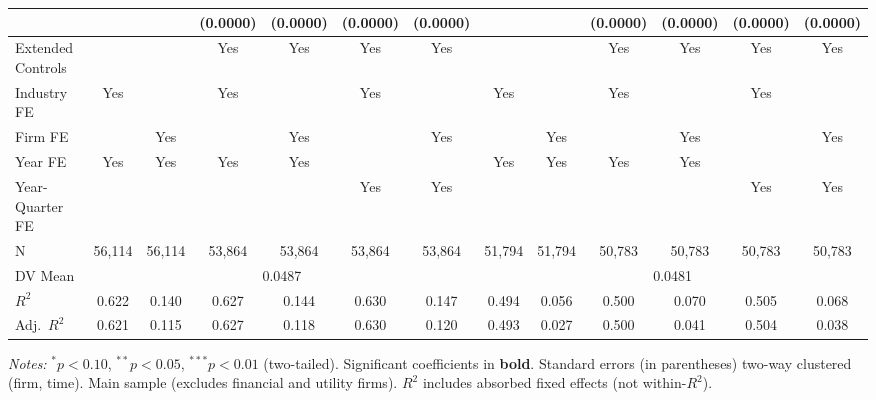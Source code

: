 \documentclass[11pt,a4paper]{article}
\begin{document}
\begin{table}[htbp]
\begin{tabular}{lcccccccccccc}
 &  &  & (0.0000) & (0.0000) & (0.0000) & (0.0000) &  &  & (0.0000) & (0.0000) & (0.0000) & (0.0000) \\
\midrule
Extended Controls &  &  & Yes & Yes & Yes & Yes &  &  & Yes & Yes & Yes & Yes \\
Industry FE & Yes &  & Yes &  & Yes &  & Yes &  & Yes &  & Yes &  \\
Firm FE &  & Yes &  & Yes &  & Yes &  & Yes &  & Yes &  & Yes \\
Year FE & Yes & Yes & Yes & Yes &  &  & Yes & Yes & Yes & Yes &  &  \\
Year-Quarter FE &  &  &  &  & Yes & Yes &  &  &  &  & Yes & Yes \\
\midrule
N & 56,114 & 56,114 & 53,864 & 53,864 & 53,864 & 53,864 & 51,794 & 51,794 & 50,783 & 50,783 & 50,783 & 50,783 \\
DV Mean & \multicolumn{6}{c}{0.0487} & \multicolumn{6}{c}{0.0481} \\
$R^2$ & 0.622 & 0.140 & 0.627 & 0.144 & 0.630 & 0.147 & 0.494 & 0.056 & 0.500 & 0.070 & 0.505 & 0.068 \\
Adj.~$R^2$ & 0.621 & 0.115 & 0.627 & 0.118 & 0.630 & 0.120 & 0.493 & 0.027 & 0.500 & 0.041 & 0.504 & 0.038 \\
\bottomrule
\end{tabular}
\begin{minipage}{\linewidth}
\vspace{2pt}\scriptsize
\textit{Notes:} $^{*}p<0.10$, $^{**}p<0.05$, $^{***}p<0.01$ (two-tailed).
 Significant coefficients in \textbf{bold}.
 Standard errors (in parentheses) two-way clustered (firm, time).
 Main sample (excludes financial and utility firms).
 $R^2$ includes absorbed fixed effects (not within-$R^2$).
\end{minipage}
\end{table}
\clearpage
\end{document}
